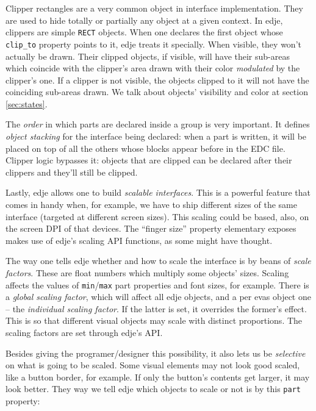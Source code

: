\documentclass[a4paper]{profusion}
\begin{document}
Clipper rectangles are a very common object in interface
implementation.  They are used to hide totally or partially any object
at a given context.  In edje, clippers are simple \texttt{RECT}
objects. When one declares the first object whose \texttt{clip\_to}
property points to it, edje treats it specially. When visible, they
won't actually be drawn.  Their clipped objects, if visible, will have
their sub-areas which coincide with the clipper's area drawn with
their color \emph{modulated} by the clipper's one. If a clipper is not
visible, the objects clipped to it will not have the coinciding
sub-areas drawn. We talk about objects' visibility and color at
section \ref{sec:states}.

The \emph{order} in which parts are declared inside a group is very
important. It defines \emph{object stacking} for the interface being
declared: when a part is written, it will be placed on top of all the
others whose blocks appear before in the EDC file. Clipper logic
bypasses it: objects that are clipped can be declared after their
clippers and they'll still be clipped.

Lastly, edje allows one to build \emph{scalable interfaces}. This is a
powerful feature that comes in handy when, for example, we have to
ship different sizes of the same interface (targeted at different
screen sizes). This scaling could be based, also, on the screen DPI of
that devices. The ``finger size'' property elementary exposes makes
use of edje's scaling API functions, as some might have thought.

The way one tells edje whether and how to scale the interface is by
beans of \emph{scale factors}. These are float numbers which multiply
some objects' sizes. Scaling affects the values of
\texttt{min}/\texttt{max} part properties and font sizes, for example.
There is a \emph{global scaling factor}, which will affect all edje
objects, and a per evas object one -- the \emph{individual scaling
  factor}. If the latter is set, it overrides the former's effect.
This is so that different visual objects may scale with distinct
proportions. The scaling factors are set through edje's API.

Besides giving the programer/designer this possibility, it also lets
us be \emph{selective} on what is going to be scaled. Some visual
elements may not look good scaled, like a button border, for
example. If only the button's contents get larger, it may look
better. They way we tell edje which objects to scale or not is by this
\texttt{part} property:
\end{document}

